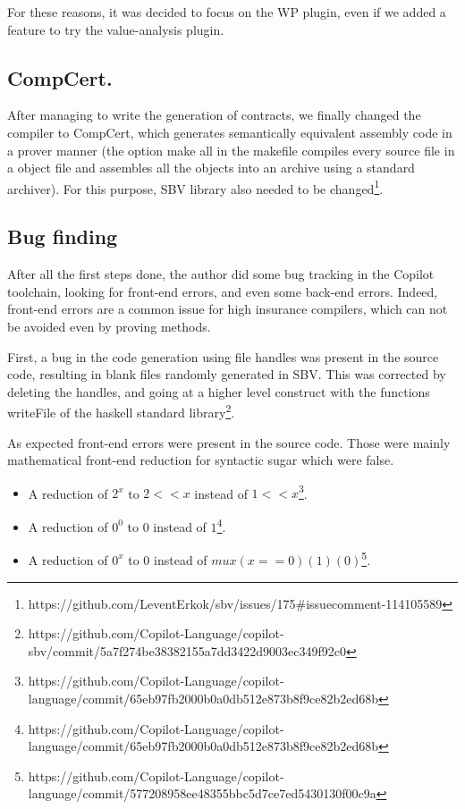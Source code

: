 \documentclass[a4paper,11pt,final]{article}
\begin{document}
  For these reasons, it was decided to focus on the WP plugin, even if we added a feature to try the value-analysis plugin.
  \subsection{CompCert.}
  
  After managing to write the generation of contracts, we finally changed the compiler to CompCert, which generates semantically equivalent assembly code in a prover manner (the option make all in the makefile compiles every source file in a object file and assembles all the objects into an archive using a standard archiver). For this purpose, SBV library also needed to be changed\footnote{https://github.com/LeventErkok/sbv/issues/175\#issuecomment-114105589}.
  
  \subsection{Bug finding}
  After all the first steps done, the author did some bug tracking in the Copilot toolchain, looking for front-end errors, and even some back-end errors. Indeed, front-end errors are a common issue for high insurance compilers, which can not be avoided even by proving methods\cite{bugC}. 
  
  First, a bug in the code generation using file handles was present in the source code, resulting in blank files randomly generated in SBV. This was corrected by deleting the handles, and going at a higher level construct with the functions writeFile of the haskell standard library\footnote{https://github.com/Copilot-Language/copilot-sbv/commit/5a7f274be38382155a7dd3422d9003ec349f92c0}. 
  
  As expected front-end errors were present in the source code. Those were mainly mathematical front-end reduction for syntactic sugar which were false.
  
 \begin{itemize}
 	\item A reduction of $2^x$ to $2 << x$ instead of $1 << x$\footnote{https://github.com/Copilot-Language/copilot-language/commit/65eb97fb2000b0a0db512e873b8f9ce82b2ed68b}.
 	\item A reduction of $0^0$ to $0$ instead of $1$\footnote{https://github.com/Copilot-Language/copilot-language/commit/65eb97fb2000b0a0db512e873b8f9ce82b2ed68b}.
 	\item A reduction of $0^x$ to $0$ instead of $mux (x==0) (1) (0)$\footnote{https://github.com/Copilot-Language/copilot-language/commit/577208958ee48355bbc5d7ce7ed5430130f00c9a}.
 \end{itemize}
  
\end{document}
